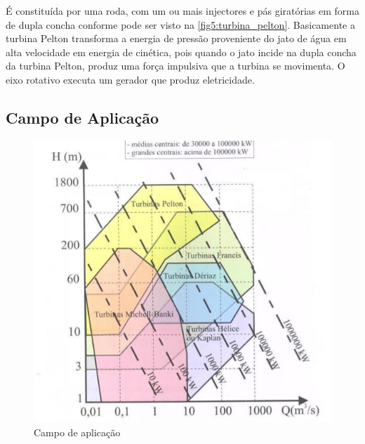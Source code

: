     É constituída por uma roda, com um ou mais injectores e pás giratórias em forma de dupla concha conforme pode ser visto na \autoref{fig5:turbina_pelton}. Basicamente a turbina Pelton transforma a energia de pressão proveniente do jato de água em alta velocidade em energia de cinética, pois quando o jato incide na dupla concha da turbina Pelton, produz uma força impulsiva que a turbina se movimenta. O eixo rotativo executa um gerador que produz eletricidade.

%
%
%


\subsection{Campo de Aplicação}

    \begin{figure}[htb]
        \centering
        \caption{\label{fig-camp} Campo de aplicação}
        \includegraphics[scale=0.5]{images/campo_de_aplicacao.png}
    \end{figure}

